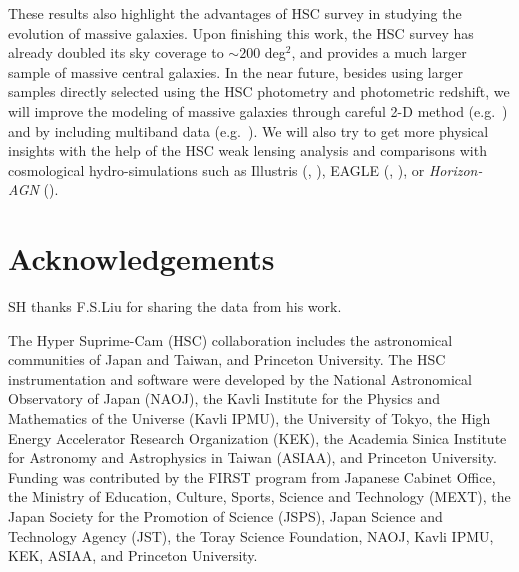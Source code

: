 \documentclass[a4paper,fleqn,usenatbib]{mnras}
\begin{document}
    These results also highlight the advantages of HSC survey in studying the 
    evolution of massive galaxies.
    Upon finishing this work, the HSC survey has already doubled its sky 
    coverage to $\sim 200$ deg$^2$, and provides a much larger sample of massive 
    central galaxies. 
    In the near future, besides using larger samples directly selected using the 
    HSC photometry and photometric redshift,
    we will improve the modeling of massive galaxies through careful 2-D method 
    (e.g.\ \citealt{Huang2013a}) and by including multiband data 
    (e.g.\ \citealt{Huang2016}).  
    We will also try to get more physical insights with the help of the HSC weak 
    lensing analysis and comparisons with cosmological hydro-simulations such as 
    Illustris (\citealt{Vogelsberger2014}, \citealt{Genel2014}), 
    EAGLE (\citealt{Schaye2015}, \citealt{Crain2015}), 
    or \textit{Horizon-AGN} (\citealt{Dubois2014}).

  
\section*{Acknowledgements}

  SH thanks F.S.Liu for sharing the data from his work.

  The Hyper Suprime-Cam (HSC) collaboration includes the astronomical communities of 
  Japan and Taiwan, and Princeton University.  The HSC instrumentation and software were
  developed by the National Astronomical Observatory of Japan (NAOJ), the Kavli Institute
  for the Physics and Mathematics of the Universe (Kavli IPMU), the University of Tokyo,
  the High Energy Accelerator Research Organization (KEK), the Academia Sinica Institute
  for Astronomy and Astrophysics in Taiwan (ASIAA), and Princeton University.  
  Funding was contributed by the FIRST program from Japanese Cabinet Office, the Ministry 
  of Education, Culture, Sports, Science and Technology (MEXT), the Japan Society for 
  the Promotion of Science (JSPS), Japan Science and Technology Agency (JST), the
  Toray Science Foundation, NAOJ, Kavli IPMU, KEK, ASIAA, and Princeton University.
   
\end{document}
